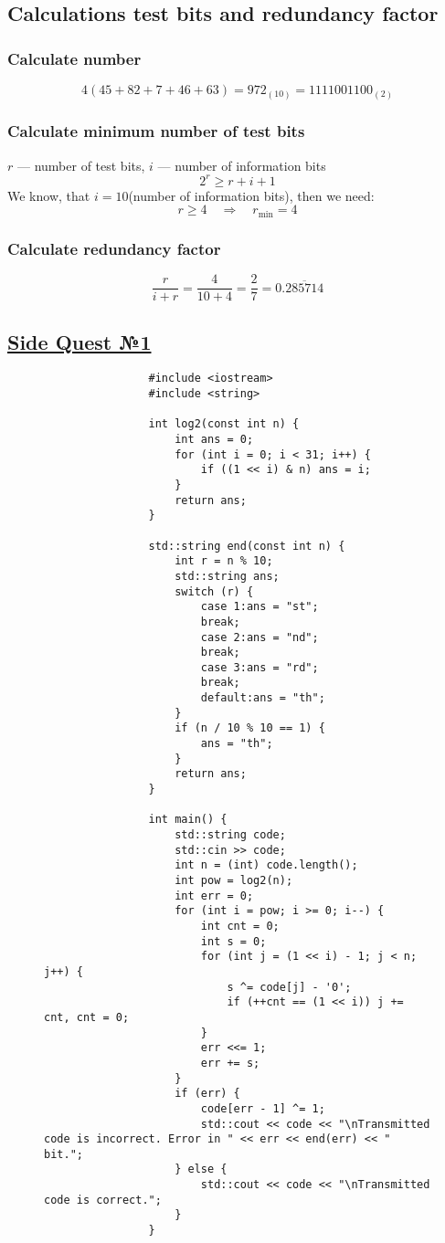 \documentclass[12pt]{article}
\begin{document}
	\subsection{\Large Calculations test bits and redundancy factor}
	\subsubsection{\Large Calculate number}
	\[4(45+82+7+46+63)=972_{(10)}=1111001100_{(2)}\]
	\subsubsection{\Large Calculate minimum number of test bits}
	\(r\) --- number of test bits, \(i\) --- number of information bits
	\[2^{r}\geq r+i+1\]
	We know, that \(i = 10\)(number of information bits), then we need: \[r\geq4 \quad \Longrightarrow \quad r_{\text{min}}=4\]
	\subsubsection{\Large Calculate redundancy factor}
	\[\frac{r}{i+r}=\frac{4}{10+4}=\frac{2}{7}=0.\overline{285714}\]
	\subsection{\Large \underline{Side Quest №1}}
	\newpage
	\thispagestyle{empty}
	\begin{figure}[H]
		\setlength{\fboxsep}{0pt}
		\setlength{\fboxrule}{0pt}
		\begin{center}
			\begin{lstlisting}
				#include <iostream>
				#include <string>
				
				int log2(const int n) {
					int ans = 0;
					for (int i = 0; i < 31; i++) {
						if ((1 << i) & n) ans = i;
					}
					return ans;
				}
				
				std::string end(const int n) {
					int r = n % 10;
					std::string ans;
					switch (r) {
						case 1:ans = "st";
						break;
						case 2:ans = "nd";
						break;
						case 3:ans = "rd";
						break;
						default:ans = "th";
					}
					if (n / 10 % 10 == 1) {
						ans = "th";
					}
					return ans;
				}
				
				int main() {
					std::string code;
					std::cin >> code;
					int n = (int) code.length();
					int pow = log2(n);
					int err = 0;
					for (int i = pow; i >= 0; i--) {
						int cnt = 0;
						int s = 0;
						for (int j = (1 << i) - 1; j < n; j++) {
							s ^= code[j] - '0';
							if (++cnt == (1 << i)) j += cnt, cnt = 0;
						}
						err <<= 1;
						err += s;
					}
					if (err) {
						code[err - 1] ^= 1;
						std::cout << code << "\nTransmitted code is incorrect. Error in " << err << end(err) << " bit.";
					} else {
						std::cout << code << "\nTransmitted code is correct.";
					}
				}
			\end{lstlisting}
		\end{center}
	\end{figure} 
\end{document}
